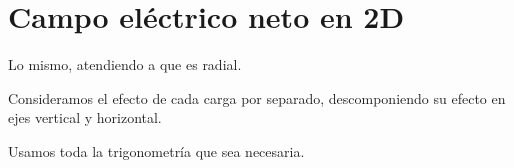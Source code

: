 \section{Campo eléctrico neto en 2D}

Lo mismo,
atendiendo a que es radial.

Consideramos el efecto de cada carga por separado,
descomponiendo su efecto en ejes vertical y horizontal.

Usamos toda la trigonometría que sea necesaria.